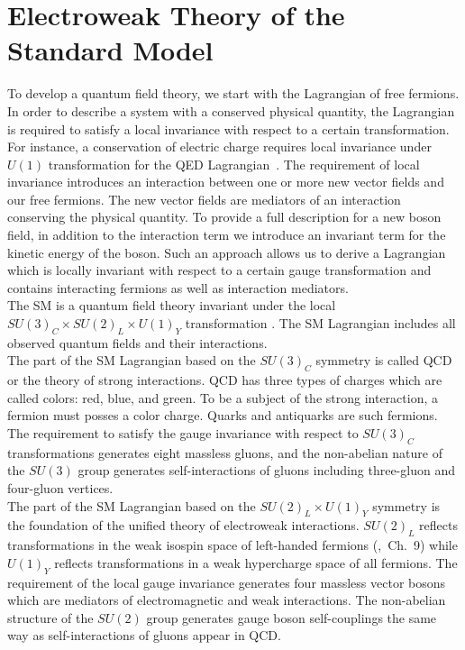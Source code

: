 \section{Electroweak Theory of the Standard Model}
\label{sec:WgAbout_SMEWK}
To develop a quantum field theory, we start with the Lagrangian of free fermions. In order to describe a system with a conserved physical quantity, the Lagrangian is required to satisfy a local invariance with respect to a certain transformation. For instance, a conservation of electric charge requires local invariance under $U(1)$ transformation for the QED Lagrangian~\cite{ref_Pich}. The requirement of local invariance introduces an interaction between one or more new vector fields and our free fermions. The new vector fields are mediators of an interaction conserving the physical quantity. To provide a full description for a new boson field, in addition to the interaction term we introduce an invariant term for the kinetic energy of the boson. Such an approach allows us to derive a Lagrangian which is locally invariant with respect to a certain gauge transformation and contains interacting fermions as well as interaction mediators. \\ 
The SM is a quantum field theory invariant under the local $SU(3)_C \times SU(2)_L \times U(1)_Y$ transformation \cite{ref_Pich}. The SM Lagrangian includes all observed quantum fields and their interactions. \\ 
The part of the SM Lagrangian based on the $SU(3)_C$ symmetry is called QCD or the theory of strong interactions. QCD has three types of charges which are called colors: red, blue, and green. To be a subject of the strong interaction, a fermion must posses a color charge. Quarks and antiquarks are such fermions. The requirement to satisfy the gauge invariance with respect to $SU(3)_C$ transformations generates eight massless gluons, and the non-abelian nature of the $SU(3)$ group generates self-interactions of gluons including three-gluon and four-gluon vertices.\\
The part of the SM Lagrangian based on the $SU(2)_L \times U(1)_Y$ symmetry is the foundation of the unified theory of electroweak interactions. $SU(2)_L$ reflects transformations in the weak isospin space of left-handed fermions (\cite{ref_Griffiths},~Ch.~9) while $U(1)_Y$ reflects transformations in a weak hypercharge space of all fermions. The requirement of the local gauge invariance generates four massless vector bosons which are mediators of electromagnetic and weak interactions. The non-abelian structure of the $SU(2)$ group generates gauge boson self-couplings the same way as self-interactions of gluons appear in QCD.\\ 
